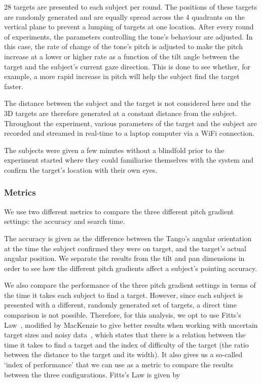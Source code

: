 \documentclass[format=sigconf, review=true, screen=true, anonymous=true]{acmart}
\begin{document}
28 targets are presented to each subject per round. The positions of these targets are randomly generated and are equally spread across the 4 quadrants on the vertical plane to prevent a lumping of targets at one location. After every round of experiments, the parameters controlling the tone's behaviour are adjusted. In this case, the rate of change of the tone's pitch is adjusted to make the pitch increase at a lower or higher rate as a function of the tilt angle between the target and the subject's current gaze direction. This is done to see whether, for example, a more rapid increase in pitch will help the subject find the target faster. 

The distance between the subject and the target is not considered here and the 3D targets are therefore generated at a constant distance from the subject. Throughout the experiment, various parameters of the target and the subject are recorded and streamed in real-time to a laptop computer via a WiFi connection.

The subjects were given a few minutes without a blindfold prior to the experiment started where they could familiarise themselves with the system and confirm the target's location with their own eyes.

\subsubsection{Metrics}

We use two different metrics to compare the three different pitch gradient settings: the accuracy and search time. 

The accuracy is given as the difference between the Tango's angular orientation at the time the subject confirmed they were on target, and the target's actual angular position. We separate the results from the tilt and pan dimensions in order to see how the different pitch gradients affect a subject's pointing accuracy. 


We also compare the performance of the three pitch gradient settings in terms of the time it takes each subject to find a target. However, since each subject is presented with a different, randomly generated set of targets, a direct time comparison is not possible. Therefore, for this analysis, we opt to use Fitts's Law~\cite{fitts1954information}, modified by MacKenzie to give better results when working with uncertain target sizes and noisy data~\cite{mackenzie1992fitts}, which states that there is a relation between the time it takes to find a target and the index of difficulty of the target (the ratio between the distance to the target and its width). It also gives us a so-called `index of performance' that we can use as a metric to compare the results between the three configurations. Fitts's Law is given by  
\end{document}
